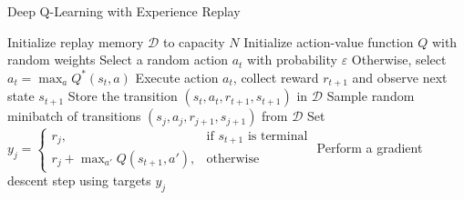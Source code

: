 \begin{algorithm}[h]
\caption{Deep Q-Learning with Experience Replay}
\label{alg:DQL}
    \begin{algorithmic}
	\STATE Initialize replay memory $\mathcal{D}$ to capacity $N$
	\STATE Initialize action-value function $Q$ with random weights
		\STATE Select a random action $a_t$ with probability $\varepsilon$
		\STATE Otherwise, select $a_t = \max_aQ^*(s_t, a)$
		\STATE Execute action $a_t$, collect reward $r_{t+1}$ and observe next state $s_{t+1}$
		\STATE Store the transition $(s_t, a_t, r_{t+1}, s_{t+1})$ in $\mathcal{D}$
		\STATE Sample random minibatch of transitions $(s_j, a_j, r_{j+1}, s_{j+1})$ from $\mathcal{D}$
		\STATE Set $ y_j = \begin{cases} r_j, & \mbox{if } s_{t+1}\mbox{ is terminal} \\ r_j + \max_{a'}Q(s_{t+1}, a'), & \mbox{otherwise}\end{cases}$
		\STATE Perform a gradient descent step using targets $y_j$
	    \ENDFOR
	\ENDFOR
    \end{algorithmic}
\end{algorithm}
%



